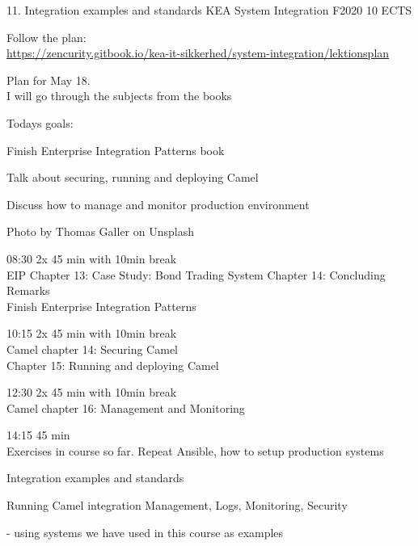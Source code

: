 \documentclass[Screen16to9,17pt]{foils}
\begin{document}
\mytitlepage
{11. Integration examples and standards}
{KEA System Integration F2020 10 ECTS}



\begin{list2}
\item Follow the plan:\\
\url{https://zencurity.gitbook.io/kea-it-sikkerhed/system-integration/lektionsplan}
\item Plan for May 18.\\
I will go through the subjects from the books
\item
\end{list2}



Todays goals:
\begin{list2}
\item Finish Enterprise Integration Patterns book
\item Talk about securing, running and deploying Camel
\item Discuss how to manage and monitor production environment
\end{list2}

Photo by Thomas Galler on Unsplash


\begin{list2}
\item 08:30 2x 45 min with 10min break\\
EIP Chapter 13: Case Study: Bond Trading System
Chapter 14: Concluding Remarks\\
Finish Enterprise Integration Patterns
\item 10:15 2x 45 min with 10min break\\
Camel chapter 14: Securing Camel\\
Chapter 15: Running and deploying Camel
\item 12:30 2x 45 min with 10min break \\
Camel chapter 16: Management and Monitoring
\item 14:15 45 min\\
Exercises in course so far. Repeat Ansible, how to setup production systems
\end{list2}





\begin{list2}
\item Integration examples and standards
\item Running Camel integration Management, Logs, Monitoring, Security
\item - using systems we have used in this course as examples
\end{list2}
\end{document}
